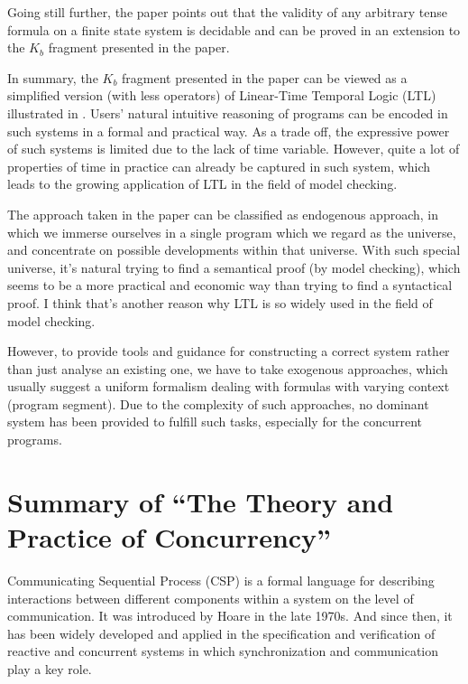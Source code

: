 \documentclass{llncs}
\begin{document}
Going still further, the paper points out that the validity of any arbitrary tense formula
on a finite state system is decidable and can be proved in an extension to the $K_b$ fragment
presented in the paper.

In summary, the $K_b$ fragment presented in the paper can be viewed as
a simplified version (with less operators) of Linear-Time Temporal Logic
(LTL) illustrated in \cite{Huth1999Logic}. Users' natural intuitive reasoning of programs
can be encoded in such systems in a formal and practical way. As a trade
off, the expressive power of such systems is limited due to the lack of time
variable. However, quite a lot of properties of time in practice can already
be captured in such system, which leads to the growing application of LTL
in the field of model checking.

The approach taken in the paper can be classified as endogenous approach,
in which we immerse ourselves in a single program which we regard as the
universe, and concentrate on possible developments within that universe. With
such special universe, it's natural trying to find a semantical proof
(by model checking), which seems to be a more practical and economic way
than trying to find a syntactical proof. I think that's another reason
why LTL is so widely used in the field of model checking.

However, to provide tools and guidance for constructing a correct system
rather than just analyse an existing one, we have to take exogenous approaches,
which usually suggest a uniform formalism dealing with formulas with varying
context (program segment). Due to the complexity of such approaches, no
dominant system has been provided to fulfill such tasks, especially for the
concurrent programs.

\newpage

\section{Summary of ``The Theory and Practice of 
  Concurrency''\cite{Roscoe1997Theory}} 
  \label{section:CSP}

Communicating Sequential Process (CSP) is a formal language for describing
interactions between different components within a system on the level of
communication. It was introduced by Hoare in the late 1970s. And since then,
it has been widely developed and applied in the specification and verification
of reactive and concurrent systems in which synchronization and communication
play a key role.
\end{document}
